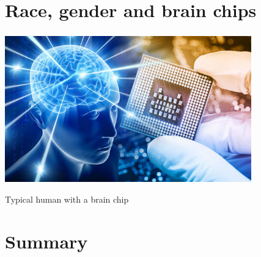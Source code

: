 \documentclass[c]{beamer}
\begin{document}
\section{Race, gender and brain chips}
\begin{frame}
\frametitle{\insertsection}
\centering
\includegraphics[width=0.8\textwidth]{4}

	Typical human with a brain chip
\end{frame}

\section*{Summary}
\begin{frame}
\frametitle{\insertsection}
\tableofcontents
\end{frame}
\end{document}
